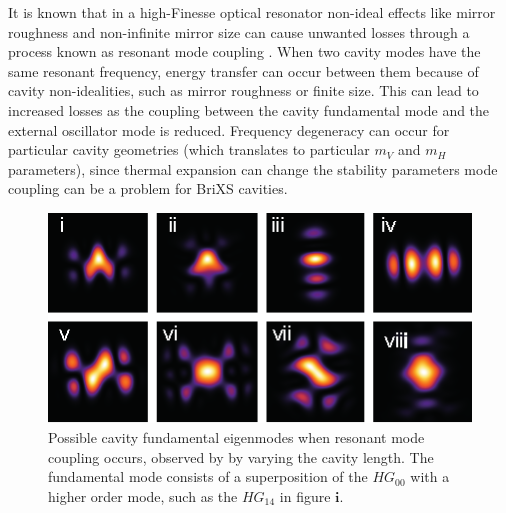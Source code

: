 It is known that in a high-Finesse optical resonator non-ideal effects like mirror roughness and non-infinite mirror size can cause unwanted losses through
a process known as resonant mode coupling \parencite{Klaassen2005,Kleckner2010,Benedikter2015}. When two cavity modes have the same resonant frequency, energy transfer can occur between them because of cavity non-idealities, such as mirror roughness or finite size. This can lead to increased losses as the coupling between the cavity fundamental mode and the external oscillator mode is reduced. Frequency degeneracy can occur for particular cavity geometries (which translates to particular $m_V$ and $m_H$ parameters), since thermal expansion can change the stability parameters mode coupling can be a problem for BriXS cavities.
\begin{figure}
	\centering
	\includegraphics[width=0.9\linewidth]{images/modemixing.eps}
	\caption{Possible cavity fundamental eigenmodes when resonant mode coupling occurs, observed by \parencite{Benedikter2015} by varying the cavity length. The fundamental mode consists of a superposition of the $HG_{00}$ with a higher order mode, such as the $HG_{14}$ in figure $\boldsymbol{i}$.  }
	\label{fig:modemixing}
\end{figure}

